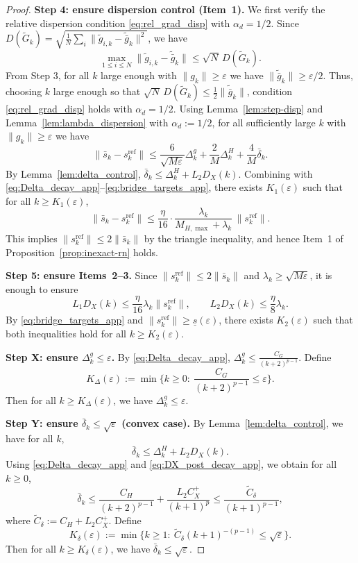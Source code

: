 \documentclass[10pt,twocolumn,letterpaper]{article}
\theoremstyle{compact}
\theoremstyle{compactremark}
\begin{document}
\begin{proof}
\vspace{1pt}
\noindent\textbf{Step 4: ensure dispersion control (Item~1).}
We first verify the relative dispersion condition \eqref{eq:rel_grad_disp} with $\alpha_d=1/2$.
Since $D(\tilde G_k)=\sqrt{\frac1N\sum_i\|\tilde g_{i,k}-\tilde{\bar g}_k\|^2}$, we have
\[
\max_{1\le i\le N}\|\tilde g_{i,k}-\tilde{\bar g}_k\|
\le \sqrt{N}\,D(\tilde G_k).
\]
From Step 3, for all $k$ large enough with $\|g_k\|\ge \varepsilon$ we have $\|\tilde{\bar g}_k\|\ge \varepsilon/2$.
Thus, choosing $k$ large enough so that $\sqrt N\,D(\tilde G_k)\le \frac12\|\tilde{\bar g}_k\|$,
condition \eqref{eq:rel_grad_disp} holds with $\alpha_d=1/2$.
Using Lemma~\ref{lem:step-disp} and Lemma~\ref{lem:lambda_dispersion} with $\alpha_d:=1/2$,
for all sufficiently large $k$ with $\|g_k\|\ge \varepsilon$ we have
\[
\|\bar s_k-s_k^{\mathrm{ref}}\|
\le \frac{6}{\sqrt{M\varepsilon}}\Delta_k^g+\frac{2}{M}\Delta_k^H+\frac{4}{M}\bar\delta_k.
\]
By Lemma~\ref{lem:delta_control}, $\bar\delta_k\le \Delta_k^H+L_2D_X(k)$.
Combining with \eqref{eq:Delta_decay_app}--\eqref{eq:bridge_targets_app}, there exists $K_1(\varepsilon)$ such that for all $k\ge K_1(\varepsilon)$,
\[
\|\bar s_k-s_k^{\mathrm{ref}}\|\le \frac{\eta}{16}\cdot \frac{\lambda_k}{M_{H,\max}+\lambda_k}\,\|s_k^{\mathrm{ref}}\|.
\]
This implies $\|s_k^{\mathrm{ref}}\|\le 2\|\bar s_k\|$ by the triangle inequality, and hence Item~1 of Proposition~\ref{prop:inexact-rn} holds.

\vspace{1pt}
\noindent\textbf{Step 5: ensure Items~2--3.}
Since $\|s_k^{\mathrm{ref}}\|\le 2\|\bar s_k\|$ and $\lambda_k\ge \sqrt{M\varepsilon}$, it is enough to ensure
\[
L_1D_X(k)\le \frac{\eta}{16}\lambda_k\|s_k^{\mathrm{ref}}\|,
\qquad
L_2D_X(k)\le \frac{\eta}{8}\lambda_k.
\]
By \eqref{eq:bridge_targets_app} and $\|s_k^{\mathrm{ref}}\|\ge \underline s(\varepsilon)$, there exists $K_2(\varepsilon)$ such that both inequalities hold for all $k\ge K_2(\varepsilon)$.

\vspace{1pt}
\noindent\textbf{Step X: ensure $\Delta_k^g\le \varepsilon$.}
By \eqref{eq:Delta_decay_app}, $\Delta_k^g\le \frac{C_G}{(k+2)^{p-1}}$.
Define
\[
K_\Delta(\varepsilon):=\min\Big\{k\ge 0:\ \frac{C_G}{(k+2)^{p-1}}\le \varepsilon\Big\}.
\]
Then for all $k\ge K_\Delta(\varepsilon)$, we have $\Delta_k^g\le \varepsilon$.

\vspace{1pt}
\noindent\textbf{Step Y: ensure $\bar\delta_k\le \sqrt{\varepsilon}$ (convex case).}
By Lemma~\ref{lem:delta_control}, we have for all $k$,
\[
\bar\delta_k\le \Delta_k^H + L_2D_X(k).
\]
Using \eqref{eq:Delta_decay_app} and \eqref{eq:DX_post_decay_app}, we obtain for all $k\ge 0$,
\[
\bar\delta_k
\le \frac{C_H}{(k+2)^{p-1}}+\frac{L_2C_X^{+}}{(k+1)^p}
\le \frac{\widetilde C_\delta}{(k+1)^{p-1}},
\]
where $\widetilde C_\delta:=C_H+L_2C_X^{+}$.
Define
\[
K_\delta(\varepsilon):=\min\Big\{k\ge 1:\ \widetilde C_\delta (k+1)^{-(p-1)}\le \sqrt{\varepsilon}\Big\}.
\]
Then for all $k\ge K_\delta(\varepsilon)$, we have $\bar\delta_k\le \sqrt{\varepsilon}$.


\end{proof}
\end{document}
